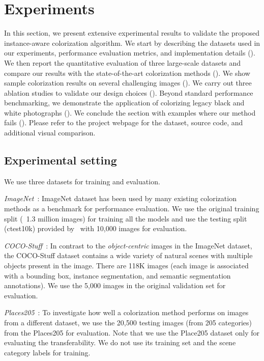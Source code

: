 \section{Experiments}
\label{sec:results}

In this section, we present extensive experimental results to validate the proposed instance-aware colorization algorithm. 
We start by describing the datasets used in our experiments, performance evaluation metrics, and implementation details ().
We then report the quantitative evaluation of three large-scale datasets and compare our results with the state-of-the-art colorization methods ().
We show sample colorization results on several challenging images ().
We carry out three ablation studies to validate our design choices ().
Beyond standard performance benchmarking, we demonstrate the application of colorizing legacy black and white photographs ().
We conclude the section with examples where our method fails ().
Please refer to the project webpage for the dataset, source code, and additional visual comparison.

\subsection{Experimental setting}
\label{sec:setting}

We use three datasets for training and evaluation.

\emph{ImageNet}~\cite{ILSVRC15}: ImageNet dataset has been used by many existing colorization methods as a benchmark for performance evaluation. We use the original training split (~1.3 million images) for training all the models and use the testing split (ctest10k) provided by~\cite{Larsson-ECCV-2016} with 10,000 images for evaluation.

\emph{COCO-Stuff}~\cite{caesar-CVPR-2018}: In contrast to the \emph{object-centric} images in the ImageNet dataset, the COCO-Stuff dataset contains a wide variety of natural scenes with multiple objects present in the image. 
There are 118K images (each image is associated with a bounding box, instance segmentation, and semantic segmentation annotations). 
We use the 5,000 images in the original validation set for evaluation.

\emph{Places205}~\cite{zhou-CVPR-2014}: To investigate how well a colorization method performs on images from a different dataset, we use the 20,500 testing images (from 205 categories) from the Places205 for evaluation. 
Note that we use the Place205 dataset only for evaluating the transferability. 
We do not use its training set and the scene category labels for training.

